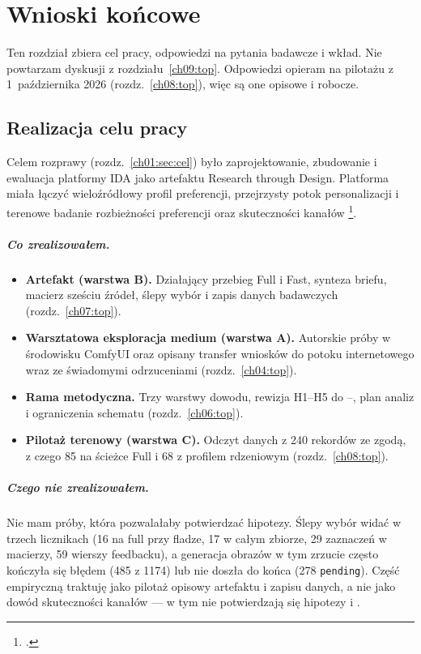 \chapter{Wnioski końcowe}
\label{ch10:top}

Ten rozdział zbiera cel pracy, odpowiedzi na pytania badawcze i wkład. Nie powtarzam dyskusji z rozdziału~\ref{ch09:top}. Odpowiedzi opieram na pilotażu z 1~października 2026 (rozdz.~\ref{ch08:top}), więc są one opisowe i robocze.

\section{Realizacja celu pracy}
\label{ch10:sec:cel}

Celem rozprawy (rozdz.~\ref{ch01:sec:cel}) było zaprojektowanie, zbudowanie i ewaluacja platformy IDA jako artefaktu Research through Design. Platforma miała łączyć wieloźródłowy profil preferencji, przejrzysty potok personalizacji i terenowe badanie rozbieżności preferencji oraz skuteczności kanałów \footcite{idaPlatform2026}.

\paragraph{Co zrealizowałem.}
\begin{itemize}
  \item \textbf{Artefakt (warstwa B).} Działający przebieg Full i Fast, synteza briefu, macierz sześciu źródeł, ślepy wybór i zapis danych badawczych (rozdz.~\ref{ch07:top}).
  \item \textbf{Warsztatowa eksploracja medium (warstwa A).} Autorskie próby w środowisku ComfyUI oraz opisany transfer wniosków do potoku internetowego wraz ze świadomymi odrzuceniami (rozdz.~\ref{ch04:top}).
  \item \textbf{Rama metodyczna.} Trzy warstwy dowodu, rewizja H1--H5 do --, plan analiz i ograniczenia schematu (rozdz.~\ref{ch06:top}).
  \item \textbf{Pilotaż terenowy (warstwa C).} Odczyt danych z 240 rekordów ze zgodą, z czego 85 na ścieżce Full i 68 z profilem rdzeniowym (rozdz.~\ref{ch08:top}).
\end{itemize}

\paragraph{Czego nie zrealizowałem.}
Nie mam próby, która pozwalałaby potwierdzać hipotezy. Ślepy wybór widać w trzech licznikach (16 na full przy fladze, 17 w całym zbiorze, 29 zaznaczeń w macierzy, 59 wierszy feedbacku), a generacja obrazów w tym zrzucie często kończyła się błędem (485 z 1174) lub nie doszła do końca (278 \texttt{pending}). Część empiryczną traktuję jako pilotaż opisowy artefaktu i zapisu danych, a nie jako dowód skuteczności kanałów --- w tym nie potwierdzają się hipotezy  i .

